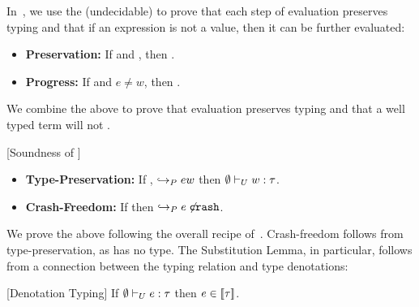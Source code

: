 In~\cite{vazou14techrep}, we use the (undecidable) \rsubbase to prove that each step 
of evaluation preserves typing and that if an expression
is not a value, then it can be further evaluated:
%
\begin{itemize}
\item\textbf{Preservation:} 
	If  and , 
	then . 
\item\textbf{Progress:}
	If  and $e \not = w$,
	then . 
\end{itemize}
%
We combine the above to prove that evaluation preserves 
typing and that a well typed term will not \ecrash.
%
\begin{theorem}{[Soundness of \undeclang]}\label{thm:safety}
\begin{itemize}
\item\textbf{Type-Preservation:} If , %
       $\hookrightarrow_P {e}{w}$ then $\emptyset \vdash_U w:\tau$.
\item\textbf{Crash-Freedom:} If  
        then $\hookrightarrow_P {e\not}{\mathtt{crash}}$.
\end{itemize}
\end{theorem}

We prove the above following the overall recipe of~\cite{Knowles10}. 
Crash-freedom follows from type-preservation, as \ecrash has no type.
%
The Substitution Lemma, in particular, follows from a connection between
the typing relation and type denotations:

\begin{lemma}{[Denotation Typing]}\label{lem:denotation}
If $\emptyset \vdash_U e:\tau$ then $e \in [\![\tau]\!]$.
\end{lemma} 

